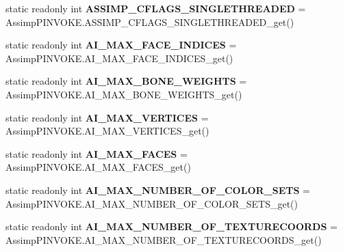 \begin{DoxyCompactItemize}
\item 
\hypertarget{class_assimp_ae914d7c66d85fe6bf512a32894058292}{static readonly int {\bfseries A\+S\+S\+I\+M\+P\+\_\+\+C\+F\+L\+A\+G\+S\+\_\+\+S\+I\+N\+G\+L\+E\+T\+H\+R\+E\+A\+D\+E\+D} = Assimp\+P\+I\+N\+V\+O\+K\+E.\+A\+S\+S\+I\+M\+P\+\_\+\+C\+F\+L\+A\+G\+S\+\_\+\+S\+I\+N\+G\+L\+E\+T\+H\+R\+E\+A\+D\+E\+D\+\_\+get()}\label{class_assimp_ae914d7c66d85fe6bf512a32894058292}

\item 
\hypertarget{class_assimp_a3ef1c7a065bd0560e6ee042f0daa0849}{static readonly int {\bfseries A\+I\+\_\+\+M\+A\+X\+\_\+\+F\+A\+C\+E\+\_\+\+I\+N\+D\+I\+C\+E\+S} = Assimp\+P\+I\+N\+V\+O\+K\+E.\+A\+I\+\_\+\+M\+A\+X\+\_\+\+F\+A\+C\+E\+\_\+\+I\+N\+D\+I\+C\+E\+S\+\_\+get()}\label{class_assimp_a3ef1c7a065bd0560e6ee042f0daa0849}

\item 
\hypertarget{class_assimp_ae0641d9d9569165659be13113883bf73}{static readonly int {\bfseries A\+I\+\_\+\+M\+A\+X\+\_\+\+B\+O\+N\+E\+\_\+\+W\+E\+I\+G\+H\+T\+S} = Assimp\+P\+I\+N\+V\+O\+K\+E.\+A\+I\+\_\+\+M\+A\+X\+\_\+\+B\+O\+N\+E\+\_\+\+W\+E\+I\+G\+H\+T\+S\+\_\+get()}\label{class_assimp_ae0641d9d9569165659be13113883bf73}

\item 
\hypertarget{class_assimp_a09a33ee4fc22bf5fb4c499132ddacd91}{static readonly int {\bfseries A\+I\+\_\+\+M\+A\+X\+\_\+\+V\+E\+R\+T\+I\+C\+E\+S} = Assimp\+P\+I\+N\+V\+O\+K\+E.\+A\+I\+\_\+\+M\+A\+X\+\_\+\+V\+E\+R\+T\+I\+C\+E\+S\+\_\+get()}\label{class_assimp_a09a33ee4fc22bf5fb4c499132ddacd91}

\item 
\hypertarget{class_assimp_af3bfdd84cd2fcae6298728e4ff8dd128}{static readonly int {\bfseries A\+I\+\_\+\+M\+A\+X\+\_\+\+F\+A\+C\+E\+S} = Assimp\+P\+I\+N\+V\+O\+K\+E.\+A\+I\+\_\+\+M\+A\+X\+\_\+\+F\+A\+C\+E\+S\+\_\+get()}\label{class_assimp_af3bfdd84cd2fcae6298728e4ff8dd128}

\item 
\hypertarget{class_assimp_a73f6fcd9bd61eb9965c914eb413958ef}{static readonly int {\bfseries A\+I\+\_\+\+M\+A\+X\+\_\+\+N\+U\+M\+B\+E\+R\+\_\+\+O\+F\+\_\+\+C\+O\+L\+O\+R\+\_\+\+S\+E\+T\+S} = Assimp\+P\+I\+N\+V\+O\+K\+E.\+A\+I\+\_\+\+M\+A\+X\+\_\+\+N\+U\+M\+B\+E\+R\+\_\+\+O\+F\+\_\+\+C\+O\+L\+O\+R\+\_\+\+S\+E\+T\+S\+\_\+get()}\label{class_assimp_a73f6fcd9bd61eb9965c914eb413958ef}

\item 
\hypertarget{class_assimp_ad50a068e41fa2eacea1883b5682be44e}{static readonly int {\bfseries A\+I\+\_\+\+M\+A\+X\+\_\+\+N\+U\+M\+B\+E\+R\+\_\+\+O\+F\+\_\+\+T\+E\+X\+T\+U\+R\+E\+C\+O\+O\+R\+D\+S} = Assimp\+P\+I\+N\+V\+O\+K\+E.\+A\+I\+\_\+\+M\+A\+X\+\_\+\+N\+U\+M\+B\+E\+R\+\_\+\+O\+F\+\_\+\+T\+E\+X\+T\+U\+R\+E\+C\+O\+O\+R\+D\+S\+\_\+get()}\label{class_assimp_ad50a068e41fa2eacea1883b5682be44e}


\end{DoxyCompactItemize}

